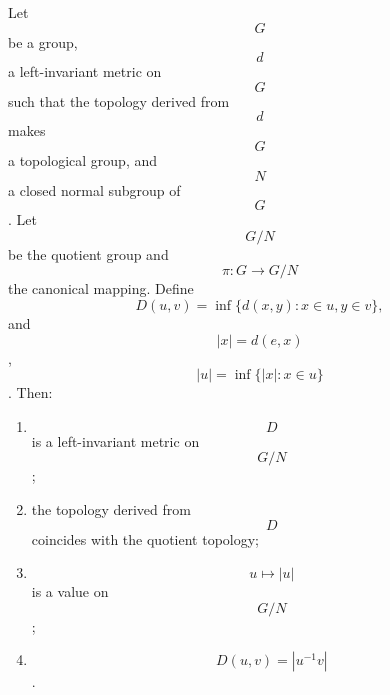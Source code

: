 Let $$G$$ be a group, $$d$$ a left-invariant metric on $$G$$ such that the topology derived from $$d$$ makes $$G$$ a topological group, and $$N$$ a closed normal subgroup of $$G$$. Let $$G/N$$ be the quotient group and $$\pi: G \to G/N$$ the canonical mapping. Define
$$D(u, v) = \inf \{d(x, y) : x \in u, y \in v\},$$
and $$|x| = d(e, x)$$, $$|u| = \inf \{|x| : x \in u\}$$. Then:
\begin{enumerate}
\item $$D$$ is a left-invariant metric on $$G/N$$;
\item the topology derived from $$D$$ coincides with the quotient topology;
\item $$u \mapsto |u|$$ is a value on $$G/N$$;
\item $$D(u, v) = |u^{-1}v|$$.
\end{enumerate}
